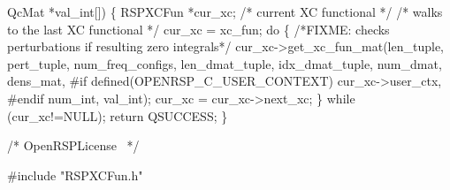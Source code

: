                           QcMat *val_int[])
\{
    RSPXCFun *cur_xc;  /* current XC functional */
    /* walks to the last XC functional */
    cur_xc = xc_fun;
    do \{
/*FIXME: checks perturbations if resulting zero integrals*/
        cur_xc->get_xc_fun_mat(len_tuple,
                               pert_tuple,
                               num_freq_configs,
                               len_dmat_tuple,
                               idx_dmat_tuple,
                               num_dmat,
                               dens_mat,
#if defined(OPENRSP_C_USER_CONTEXT)
                               cur_xc->user_ctx,
#endif
                               num_int,
                               val_int);
        cur_xc = cur_xc->next_xc;
    \} while (cur_xc!=NULL);
    return QSUCCESS;
\}

\nwendcode{}\endmoddef
/*
  \LA{}OpenRSPLicense~{\nwtagstyle{}}\RA{}
*/

#include "RSPXCFun.h"

